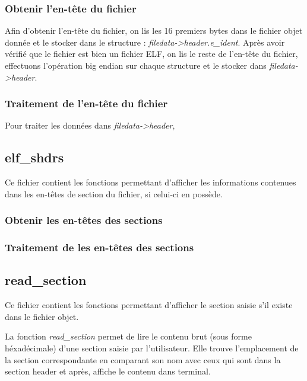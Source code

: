 \documentclass[a4paper]{article} %
\begin{document}
\subsubsection*{Obtenir l'en-tête du fichier}
Afin d'obtenir l'en-tête du fichier, on lis les 16 premiers bytes dans le fichier 
objet donnée et le stocker dans le structure : \textit{filedata->header.e\_ident}.
Après avoir vérifié que le fichier est bien un fichier ELF, on lis le 
reste de l'en-tête du fichier, effectuons l'opération big endian sur chaque 
structure et le stocker dans \textit{filedata->header}.

\subsubsection*{Traitement de l'en-tête du fichier}
Pour traiter les données dans \textit{filedata->header}, 


\subsection{elf\_shdrs}
\label{sec:sectionheader}
\noindent Ce fichier contient les fonctions permettant d'afficher les informations contenues dans les en-têtes de section du fichier, si celui-ci en possède.

\subsubsection*{Obtenir les en-têtes des sections}

\subsubsection*{Traitement de les en-têtes des sections}


\subsection{read\_section}
\label{sec:section}
Ce fichier contient les fonctions permettant d'afficher le section saisie s'il existe
dans le fichier objet. 
\newline

La fonction \textit{read\_section} permet de lire le contenu brut 
(sous forme héxadécimale) d'une section saisie par l'utilisateur. Elle trouve 
l'emplacement de la section correspondante en comparant son nom avec ceux qui 
sont dans la section header et après, affiche le contenu dans terminal.
\end{document}
